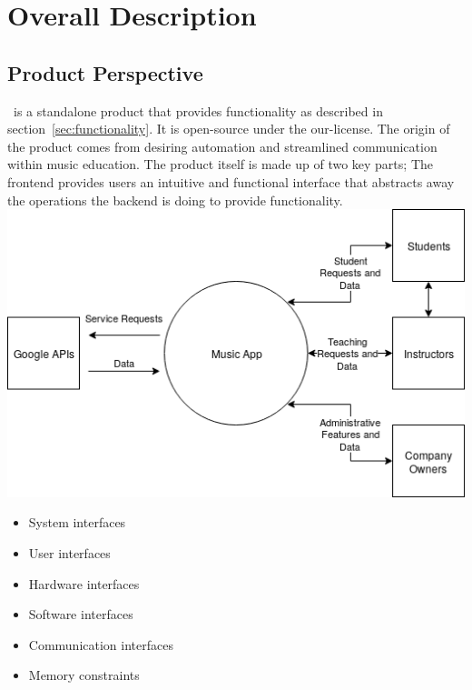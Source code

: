 \section{Overall Description}\label{sec:overall-description}
    \subsection{Product Perspective}\label{sec:product-perspective}
        \projectName\ is a standalone product that provides functionality as described in section~\ref{sec:functionality}. It is \gls{open-source} under the \gls{our-license}. The origin of the product comes from desiring automation and streamlined communication within music education. The product itself is made up of two key parts; The frontend provides users an intuitive and functional interface that abstracts away the operations the backend is doing to provide functionality.
        \\\includegraphics[width=\textwidth]{images/Context-Diagram.png}
        \begin{itemize}
            \item System interfaces
            \item User interfaces
            \item Hardware interfaces
            \item Software interfaces
            \item Communication interfaces
            \item Memory constraints
        \end{itemize}
